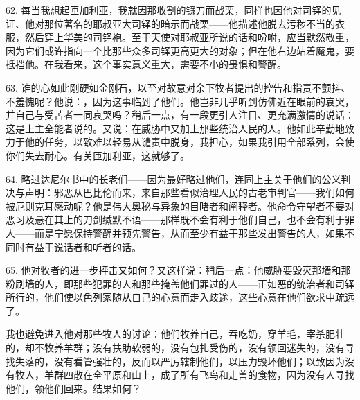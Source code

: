 62. 每当我想起匝加利亚，我就因那收割的镰刀而战栗，同样也因他对司铎的见证、他对那位著名的耶叔亚大司铎的暗示而战栗——他描述他脱去污秽不当的衣服，然后穿上华美的司铎袍。至于天使对耶叔亚所说的话和吩咐，应当默然敬重，因为它们或许指向一个比那些众多司铎更高更大的对象；但在他右边站着魔鬼，要抵挡他。在我看来，这个事实意义重大，需要不小的畏惧和警醒。\par

63. 谁的心如此刚硬如金刚石，以至对故意对余下牧者提出的控告和指责不颤抖、不羞愧呢？他说：，因为这事临到了他们。他岂非几乎听到仿佛近在眼前的哀哭，并自己与受苦者一同哀哭吗？稍后一点，有一段更引人注目、更充满激情的说话：这是上主全能者说的。又说：在威胁中又加上那些统治人民的人。他如此辛勤地致力于他的任务，以致难以轻易从谴责中脱身，我担心，如果我引用全部系列，会使你们失去耐心。有关匝加利亚，这就够了。\par

64. 略过达尼尔书中的长老们——因为最好略过他们，连同上主关于他们的公义判决与声明：邪恶从巴比伦而来，来自那些看似治理人民的古老审判官——我们如何被厄则克耳感动呢？他是伟大奥秘与异象的目睹者和阐释者。他命令守望者不要对恶习及悬在其上的刀剑缄默不语——那样既不会有利于他们自己，也不会有利于罪人——而是宁愿保持警醒并预先警告，从而至少有益于那些发出警告的人，如果不同时有益于说话者和听者的话。\par

65. 他对牧者的进一步抨击又如何？又这样说：稍后一点：他威胁要毁灭那墙和那粉刷墙的人，即那些犯罪的人和那些掩盖他们罪过的人——正如恶的统治者和司铎所行的，他们使以色列家随从自己的心意而走入歧途，这些心意在他们欲求中疏远了。\par

我也避免进入他对那些牧人的讨论：他们牧养自己，吞吃奶，穿羊毛，宰杀肥壮的，却不牧养羊群；没有扶助软弱的，没有包扎受伤的，没有领回迷失的，没有寻找失落的，没有看管强壮的，反而以严厉辖制他们，以压力毁坏他们；以致因为没有牧人，羊群四散在全平原和山上，成了所有飞鸟和走兽的食物，因为没有人寻找他们，领他们回来。结果如何？\par

